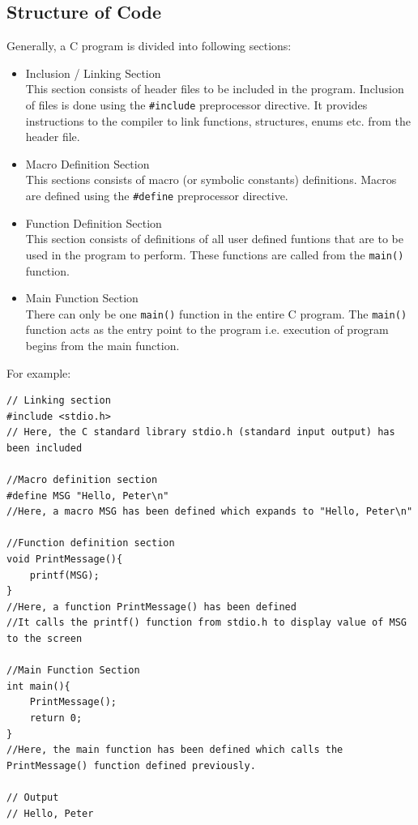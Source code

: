 \documentclass[report.tex]{subfiles}
\begin{document}
    \subsection{Structure of Code}
    Generally, a C program is divided into following sections:
    \begin{itemize}
        \item{Inclusion / Linking Section}\\
            This section consists of header files to be included in the program. Inclusion of files is done using the \texttt{\#include} preprocessor directive. It provides instructions to the compiler to link functions, structures, enums etc. from the header file.
        \item{Macro Definition Section}\\
            This sections consists of macro (or symbolic constants) definitions. Macros are defined using the \texttt{\#define} preprocessor directive. 
        \item{Function Definition Section}\\
            This section consists of definitions of all user defined funtions that are to be used in the program to perform. These functions are called from the \texttt{main()} function.
        \item{Main Function Section}\\
            There can only be one \texttt{main()} function in the entire C program. The \texttt{main()} function acts as the entry point to the program i.e. execution of program begins from the main function.
    \end{itemize}
    For example:    
\begin{lstlisting}
// Linking section
#include <stdio.h>
// Here, the C standard library stdio.h (standard input output) has been included

//Macro definition section
#define MSG "Hello, Peter\n"
//Here, a macro MSG has been defined which expands to "Hello, Peter\n"

//Function definition section
void PrintMessage(){
    printf(MSG);
}
//Here, a function PrintMessage() has been defined
//It calls the printf() function from stdio.h to display value of MSG to the screen

//Main Function Section
int main(){
    PrintMessage();
    return 0;
}
//Here, the main function has been defined which calls the PrintMessage() function defined previously.

// Output
// Hello, Peter
\end{lstlisting}
\end{document}
